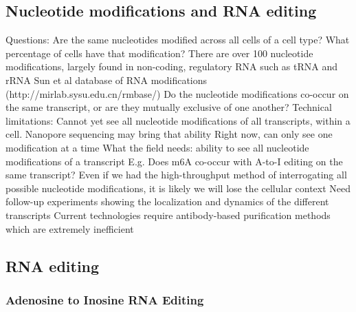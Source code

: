 \subsection{Nucleotide modifications and RNA editing}
Questions:
Are the same nucleotides modified across all cells of a cell type? 
What percentage of cells have that modification?
There are over 100 nucleotide modifications, largely found in non-coding, regulatory RNA such as tRNA and rRNA \cite{Ferre-DAmare2003-to,Ishitani2008-rf,Sun2016-rk}
Sun et al database of RNA modifications (http://mirlab.sysu.edu.cn/rmbase/) 
Do the nucleotide modifications co-occur on the same transcript, or are they mutually exclusive of one another?
Technical limitations:
Cannot yet see all nucleotide modifications of all transcripts, within a cell.
Nanopore sequencing may bring that ability
Right now, can only see one modification at a time
What the field needs: ability to see all nucleotide modifications of a transcript
E.g. Does m6A co-occur with A-to-I editing on the same transcript?
Even if we had the high-throughput method of interrogating all possible nucleotide modifications, it is likely we will lose the cellular context
Need follow-up experiments showing the localization and dynamics of the different transcripts
Current technologies require antibody-based purification methods which are extremely inefficient


\subsection{RNA editing}

\subsubsection{Adenosine to Inosine RNA Editing}

